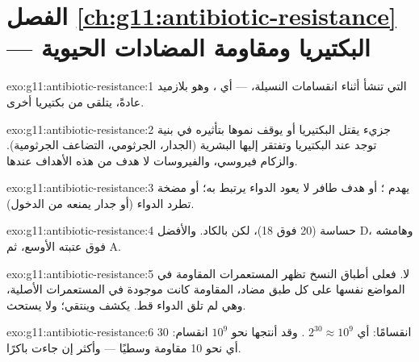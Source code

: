 \section*{الفصل \ref{ch:g11:antibiotic-resistance} --- البكتيريا ومقاومة المضادات الحيوية}

\begin{solution}{exo:g11:antibiotic-resistance:1}
 التي تنشأ أثناء انقسامات النسيلة،  ---
أي ، وهو بلازميد عادةً، يتلقى من بكتيريا أخرى.
\end{solution}

\begin{solution}{exo:g11:antibiotic-resistance:2}
جزيء يقتل البكتيريا أو يوقف نموها بتأثيره في بنية توجد عند البكتيريا
وتفتقر إليها  البشرية (الجدار،  الجرثومي، 
التضاعف الجرثومية). والزكام فيروسي، والفيروسات لا هدف من هذه الأهداف
عندها.
\end{solution}

\begin{solution}{exo:g11:antibiotic-resistance:3}
 يهدم ؛ أو هدف طافر لا يعود الدواء يرتبط به؛ أو مضخة
تطرد الدواء (أو جدار يمنعه من الدخول).
\end{solution}

\begin{solution}{exo:g11:antibiotic-resistance:4}
حساسة (20 فوق 18)، لكن بالكاد. والأفضل D، وهامشه فوق عتبته الأوسع، ثم
A.
\end{solution}

\begin{solution}{exo:g11:antibiotic-resistance:5}
لا. فعلى أطباق النسخ تظهر المستعمرات المقاومة في المواضع نفسها على كل
طبق مضاد،  المقاومة كانت موجودة في المستعمرات الأصلية، وهي لم
تلق الدواء قط.  يكشف وينتقي؛ ولا يستحث.
\end{solution}

\begin{solution}{exo:g11:antibiotic-resistance:6}
30 انقسامًا: أي $2^{30} \approx 10^9$ . وقد أنتجها نحو $10^9$
انقسام: أي نحو 10  مقاومة وسطيًا --- وأكثر إن جاءت  باكرًا.
\end{solution}

